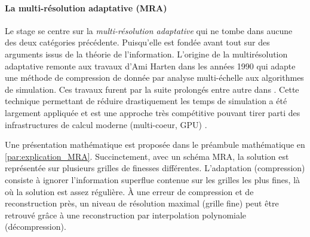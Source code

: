         \paragraph{La multi-résolution adaptative (MRA)}
        Le stage se centre sur la \textit{multi-résolution adaptative} \cite{harten1994} qui
        ne tombe dans aucune des deux catégories précédente. Puisqu'elle est fondée avant tout sur des arguments issus de la théorie de l'information.
        L'origine de la multirésolution adaptative remonte aux travaux d'Ami Harten \cite{harten1994} dans les années 1990 qui adapte 
        une méthode de compression de donnée par analyse multi-échelle aux algorithmes de simulation.
        Ces travaux furent par la suite prolongés entre autre dans \cite{Kaibara2001,Cohen2003}.
        Cette technique permettant de réduire drastiquement les temps de simulation a été largement appliquée et 
        est une approche très compétitive \cite{compare_MRA_AMR} pouvant tirer parti des infrastructures de calcul moderne (multi-coeur, GPU) \cite{GPU_bench}.\par
        Une présentation mathématique est proposée dans le préambule mathématique en \ref{par:explication_MRA}.
        Succinctement, avec un schéma MRA, la solution est représentée sur plusieurs grilles de finesses différentes.
        L'adaptation (compression) consiste à ignorer l'information superflue contenue sur les grilles les plus fines, là où la solution est assez régulière.
        À une erreur de compression et de reconstruction près, un niveau de résolution maximal (grille fine) peut être retrouvé 
        grâce à une reconstruction par interpolation polynomiale (décompression).\par 
% 


